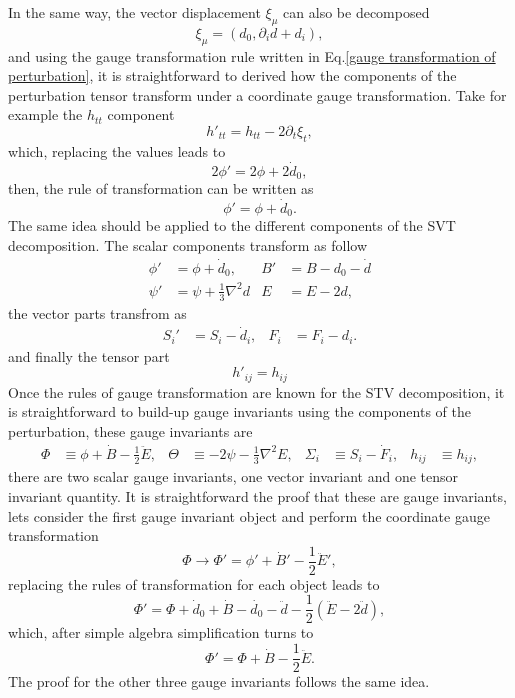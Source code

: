 \documentclass{article}
\begin{document}
In the same way, the vector displacement $\xi_{\mu}$ can also be decomposed
\begin{equation}
    \xi_{\mu} = \left(d_0, \partial_i d + d_i\right),
\end{equation}
and using the gauge transformation rule written in Eq.\eqref{gauge transformation of perturbation},
it is straightforward to derived how the components of the perturbation tensor transform
under a coordinate gauge transformation. Take for example the $h_{tt}$ component
\begin{equation}
    h'_{tt} = h_{tt} - 2\partial_{t}\xi_{t},
\end{equation}
which, replacing the values leads to
\begin{equation}
    2\phi' = 2\phi + 2\dot{d}_0,
\end{equation}
then, the rule of transformation can be written as
\begin{equation}
    \phi' = \phi + \dot{d}_0.
\end{equation}
The same idea should be applied to the different components of the SVT decomposition. The scalar
components transform as follow
\begin{align}
    \phi' & = \phi + \dot{d}_0, & B' & = B - d_0 - \dot{d} \\
    \psi' & = \psi +\frac{1}{3}\nabla^2d & E & = E - 2d,
\end{align}
the vector parts transfrom as
\begin{align}
    S_i' & = S_i - \dot{d}_i, & F_i & = F_i - d_i.
\end{align}
and finally the tensor part
\begin{equation}
    h'_{ij} = h_{ij}
\end{equation}
Once the rules of gauge transformation are known for the STV decomposition, it is
straightforward to build-up gauge invariants using the components of the perturbation, 
these gauge invariants are
\begin{align}
    \Phi & \equiv \phi + \dot{B} - \frac{1}{2}\ddot{E}, &
    \Theta & \equiv -2\psi - \frac{1}{3}\nabla^2E, &
    \Sigma_{i} & \equiv S_i - \dot{F}_i, &
    h_{ij} & \equiv h_{ij},
\end{align}
there are two scalar gauge invariants, one vector invariant and one tensor invariant
quantity. It is straightforward the proof that these are gauge invariants, lets 
consider the first gauge invariant object and perform the coordinate gauge transformation
\begin{equation}
    \Phi \to \Phi' = \phi' + \dot{B}' - \frac{1}{2}\ddot{E}',
\end{equation}
replacing the rules of transformation for each object leads to
\begin{equation}
    \Phi' = \Phi + \dot{d}_0 + \dot{B} - \dot{d_0} - \ddot{d} - 
    \frac{1}{2}\left(\ddot{E} - 2\ddot{d}\right),
\end{equation}
which, after simple algebra simplification turns to
\begin{equation}
    \Phi' = \Phi + \dot{B} - \frac{1}{2}\ddot{E}.
\end{equation}
The proof for the other three gauge invariants follows the same idea.
\end{document}
